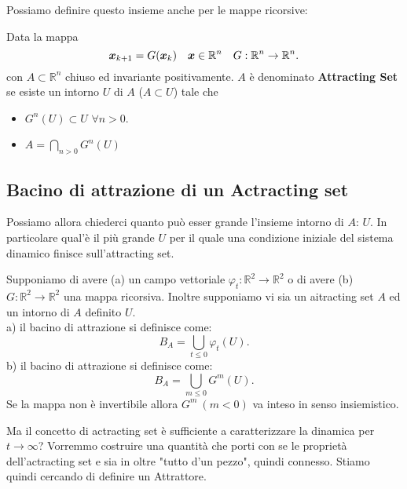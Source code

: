 \noindent
Possiamo definire questo insieme anche per le mappe ricorsive:
\begin{defn}
    Data la mappa 
    \[
	\boldsymbol{x}_{k+1} = G(\boldsymbol{x}_k) \quad\boldsymbol{x}\in \mathbb{R}^n \quad  G:\mathbb{R}^n\to \mathbb{R}^n
    .\] 
    con $A\subset\mathbb{R}^n$ chiuso ed invariante positivamente. $A$ è denominato \textbf{Attracting Set} se esiste un intorno $U$ di $A$ ($A \subset U$) tale che 
    \begin{itemize}
	\item $G^n(U) \subset U$ $\forall n > 0$.
	\item $A = \bigcap\limits_{n>0}G^n(U)$ 
    \end{itemize}
\end{defn}
\noindent
\subsection{Bacino di attrazione di un Actracting set}%
Possiamo allora chiederci quanto può esser grande l'insieme intorno di $A$: $U$. In particolare qual'è il più grande $U$ per il quale una condizione iniziale del sistema dinamico finisce sull'attracting set.
\begin{defn}
    Supponiamo di avere (a) un campo vettoriale $\varphi_t:\mathbb{R}^2\to \mathbb{R}^2$ o di avere (b) $G:\mathbb{R}^2\to \mathbb{R}^2$ una mappa ricorsiva. Inoltre supponiamo vi sia un aitracting set $A$ ed un intorno di $A$ definito $U$.\\
    a) il bacino di attrazione si definisce come:
    \[
	B_A = \bigcup\limits_{t\le 0}\varphi_t(U) 
    .\] 
    b) il bacino di attrazione si definisce come:
    \[
	B_A = \bigcup\limits_{m\le 0}G^m(U) 
    .\] 
    Se la mappa non è invertibile allora $G^m \ (m<0)$ va inteso in senso insiemistico.
\end{defn}
\noindent
Ma il concetto di actracting set è sufficiente a caratterizzare la dinamica per $t\to \infty$? Vorremmo costruire una quantità che porti con se le proprietà dell'actracting set e sia in oltre "tutto d'un pezzo", quindi connesso. Stiamo quindi cercando di definire un Attrattore.
